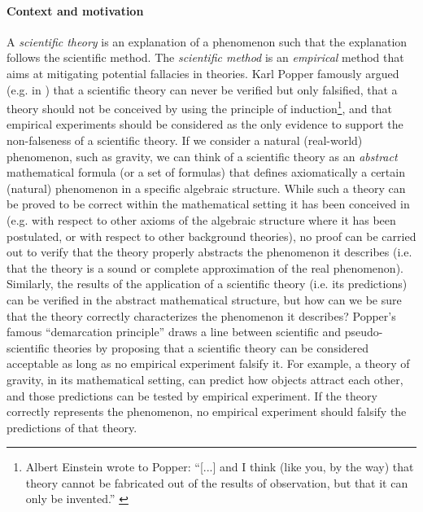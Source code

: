 \documentclass[conference]{IEEEtran}
\begin{document}
\paragraph{Context and motivation} 
A \emph{scientific theory} is an explanation of a phenomenon such that the
explanation follows the scientific method. The \emph{scientific method} is an
\emph{empirical} method that aims at mitigating potential fallacies in
theories.  Karl Popper famously argued (e.g. in \autocite{Popper1959logic})
that a scientific theory can never be verified but only falsified, that a
theory should not be conceived by using the principle of
induction\footnote{Albert  Einstein wrote to Popper: ``[...] and I think (like
you, by the way) that theory cannot be fabricated out of the results of
observation, but that it can only be invented.'' \autocite{Popper1959logic}},
and that empirical experiments should be considered as the only evidence to
support the non-falseness of a scientific theory. 
If we consider a natural (real-world) phenomenon, such as gravity, we can think
of a scientific theory as an \emph{abstract} mathematical formula (or a set of
formulas) that defines axiomatically a certain (natural) phenomenon in a
specific algebraic structure. While such a theory can be proved to be correct
within the mathematical setting it has been conceived in (e.g. with respect to
other axioms of the algebraic structure where it has been postulated, or with
respect to other background theories), no proof can be carried out to verify
that the theory properly abstracts the phenomenon it describes (i.e. that the
theory is a sound or complete approximation of the real phenomenon).
Similarly, the results of the application of a scientific theory (i.e. its
predictions) can be verified in the abstract mathematical structure, but how can
we be sure that the theory correctly characterizes the phenomenon it describes? 
Popper's famous ``demarcation principle'' draws a line between scientific and
pseudo-scientific theories by proposing that a scientific theory can
be considered acceptable as long as no empirical experiment falsify it. For
example, a theory of gravity, in its mathematical setting, can predict how
objects attract each other, and those predictions can be tested by empirical
experiment. If the theory correctly represents the phenomenon, no empirical
experiment should falsify the predictions of that theory.
\end{document}
